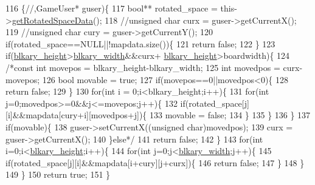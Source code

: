 \begin{DoxyCode}
116                                                                                                            
                  \{\textcolor{comment}{//,GameUser* guser)\{}
117                 \textcolor{keywordtype}{bool}** rotated\_space = this->\hyperlink{class_tetris_1_1_block_a464ed776185993ad827f316a08969960}{getRotatedSpaceData}();
118                 \textcolor{comment}{//unsigned char curx = guser->getCurrentX();}
119                 \textcolor{comment}{//unsigned char cury = guser->getCurrentY();}
120                 \textcolor{keywordflow}{if}(rotated\_space==NULL||!mapdata.size())\{
121                     \textcolor{keywordflow}{return} \textcolor{keyword}{false};
122                 \}
123                 \textcolor{keywordflow}{if}(\hyperlink{class_tetris_1_1_block_abbea7737c2b1fb7339aab4dff13de27c}{blkary\_height}>\hyperlink{class_tetris_1_1_block_a96548cab58eb788af744b54192c7bea1}{blkary\_width}&&curx+
      \hyperlink{class_tetris_1_1_block_abbea7737c2b1fb7339aab4dff13de27c}{blkary\_height}>boardwidth)\{
124                    \textcolor{comment}{/*const int movepos = blkary\_height-blkary\_width;}
125 \textcolor{comment}{                    int movedpos = curx-movepos;}
126 \textcolor{comment}{                    bool movable = true;}
127 \textcolor{comment}{                    if(movepos==0||movedpos<0)\{}
128 \textcolor{comment}{                        return false;}
129 \textcolor{comment}{                    \}}
130 \textcolor{comment}{                    for(int i = 0;i<blkary\_height;i++)\{}
131 \textcolor{comment}{                        for(int j=0;movedpos>=0&&j<=movepos;j++)\{}
132 \textcolor{comment}{                            if(rotated\_space[j][i]&&mapdata[cury+i][movedpos+j])\{}
133 \textcolor{comment}{                                movable = false;}
134 \textcolor{comment}{                            \}}
135 \textcolor{comment}{                        \}}
136 \textcolor{comment}{                    \}}
137 \textcolor{comment}{                    if(movable)\{}
138 \textcolor{comment}{                        guser->setCurrentX((unsigned char)movedpos);}
139 \textcolor{comment}{                        curx = guser->getCurrentX();}
140 \textcolor{comment}{                    \}else*/}
141                     \textcolor{keywordflow}{return} \textcolor{keyword}{false};
142                 \}
143                 \textcolor{keywordflow}{for}(\textcolor{keywordtype}{int} i=0;i<\hyperlink{class_tetris_1_1_block_abbea7737c2b1fb7339aab4dff13de27c}{blkary\_height};i++)\{
144                     \textcolor{keywordflow}{for}(\textcolor{keywordtype}{int} j=0;j<\hyperlink{class_tetris_1_1_block_a96548cab58eb788af744b54192c7bea1}{blkary\_width};j++)\{
145                         \textcolor{keywordflow}{if}(rotated\_space[j][i]&&mapdata[i+cury][j+curx])\{
146                             \textcolor{keywordflow}{return} \textcolor{keyword}{false};
147                         \}
148                     \}
149                 \}
150                 \textcolor{keywordflow}{return} \textcolor{keyword}{true};
151             \}
\end{DoxyCode}
